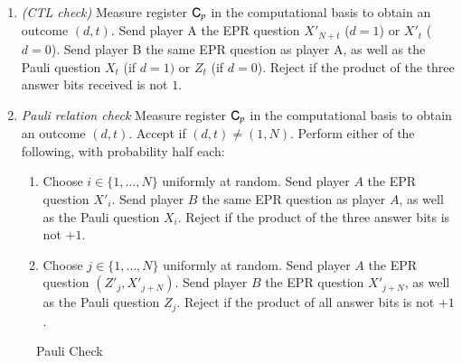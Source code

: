 \begin{center}
\begin{mdframed}
\begin{enumerate}
\item \emph{(CTL check)} Measure register ${\textsf{C}}_{p}$ in the computational basis to obtain an outcome $(d,t)$. Send player A the EPR question $X'_{N+t}$ ($d=1$) or $X'_t$ ($d=0$).  Send player B the same EPR question as player A, as well as the Pauli question $X_t$ (if $d=1)$ or $Z_t$ (if $d=0$).  Reject if the product of the three answer bits received is not $1$.

\item{\emph{Pauli relation check}} Measure register ${\textsf{C}}_p$  in the computational basis to obtain an outcome $(d,t)$. Accept if $(d,t)\neq (1,N)$. Perform either of the following, with probability half each:
\begin{enumerate}
\item Choose $i\in\{1,\ldots,N\}$ uniformly at random. Send player $A$ the EPR question $X'_i$. Send player $B$ the same EPR question as player $A$, as well as the Pauli question $X_i$. Reject if the product of the three answer bits is not $+1$. 
\item Choose $j\in\{1,\ldots,N\}$ uniformly at random. Send player $A$ the EPR question $(Z'_j,X'_{j+N})$. Send player $B$ the EPR question $X'_{j+N}$, as well as the Pauli question $Z_j$. Reject if the product of all answer bits is not $+1$. 
\end{enumerate}
	\end{enumerate}    
\end{mdframed}
\end{center}
\begin{figure}[H]
\caption{Pauli Check}
\label{fig:pauli_check}
\end{figure}


